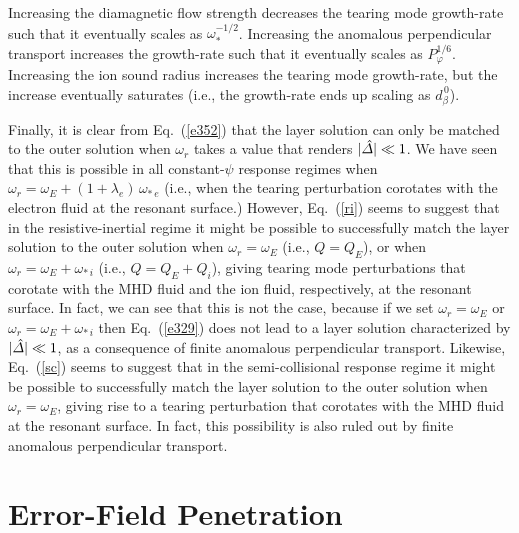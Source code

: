 \documentclass[12pt,prb,aps]{revtex4-1}
\begin{document}
Increasing  the diamagnetic flow strength decreases the tearing mode growth-rate such that it
eventually scales as $\omega_\ast^{-1/2}$. Increasing the anomalous perpendicular transport increases the
growth-rate such that it  eventually scales as $P_\varphi^{1/6}$. Increasing the ion sound radius 
increases the tearing mode growth-rate, but the increase eventually saturates (i.e., the
growth-rate ends up scaling as $d_\beta^{\,0}$). 

Finally, it is clear from Eq.~(\ref{e352}) that the layer solution can only be matched to the
outer solution when $\omega_r$ takes a value that renders $|\hat{\mit\Delta}|\ll 1$. We have seen that this
is possible in all constant-$\psi$ response regimes when $\omega_r= \omega_E+(1+\lambda_e)\,\omega_{\ast\,e}$
(i.e., when the tearing perturbation corotates with the electron fluid at the resonant surface.) However, Eq.~(\ref{ri})
seems to suggest that in the resistive-inertial regime it might be possible to successfully match the
layer solution to the outer solution when $\omega_r=\omega_E$ (i.e., $Q=Q_E$), or when 
$\omega_r=\omega_E+\omega_{\ast\,i}$
(i.e., $Q=Q_E+Q_i$),
giving tearing mode perturbations that corotate with the MHD fluid and the ion fluid, respectively, at the resonant
surface. In fact, we can see that this is not the case, because if we set $\omega_r=\omega_E$ or $\omega_r=\omega_E+\omega_{\ast\,i}$  then Eq.~(\ref{e329}) does not lead to a layer solution characterized by  $|\hat{\mit\Delta}|\ll 1$, 
as a consequence of finite anomalous perpendicular transport.\cite{ber} Likewise, Eq.~(\ref{sc}) seems to suggest that in the semi-collisional response regime it might be possible to successfully match the
layer solution to the outer solution when $\omega_r=\omega_E$, giving rise to a tearing perturbation that corotates with the MHD fluid at the resonant surface.  In fact, this possibility is also ruled out by finite anomalous
perpendicular transport. 

\section{Error-Field Penetration}\label{error}
\end{document}
